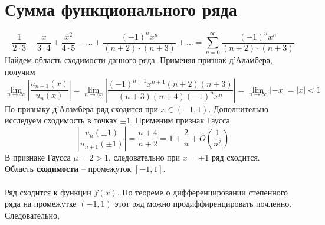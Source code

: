 \documentclass[a5paper, 10pt]{article}
\theoremstyle{definition}
\theoremstyle{plain}
\theoremstyle{remark}
\begin{document}
\newpage
\section{Сумма функционального ряда}
\begin{equation*}
\frac{1}{2 \cdot 3} - \frac{x}{3 \cdot 4} + \frac{x^2}{4 \cdot 5} - ... + \frac{(-1)^n x^n}{(n+ 2) \cdot(n+ 3)} + ... = 
\sum  \limits_{n = 0}^{\infty} \frac{(-1)^n x^n}{(n+ 2) \cdot(n+ 3)}
\end{equation*}
Найдем область сходимости данного ряда. Применяя признак  д'Аламбера, получим
\begin{equation*}
\lim_{n \to \infty} \left| \frac{u_{n+1} (x)}{u_{n} (x)} \right| =
 \lim_{n \to \infty}  \left| \frac{(-1)^{n+1} x^{n+1}(n+ 2) (n+ 3)}{(n+ 3) (n+ 4) (-1)^n x^n} \right| = 
 \lim_{n \to \infty}  \left| - x \right| = \left|  x \right|  < 1
\end{equation*}
По признаку д'Аламбера ряд сходится при $ x \in (-1, 1)$. Дополнительно исследуем сходимость в точках $\pm 1$. Применим признак Гаусса
\begin{equation*}
 \left| \frac{u_{n} (\pm 1)}{u_{n+1} (\pm 1)} \right| = \frac{n+ 4}{n+ 2} = 1 + \frac{2}{n} + O\left(\frac{1}{n^2} \right)
\end{equation*}
В признаке Гаусса $\mu = 2 > 1$, следовательно при $x = \pm 1$ ряд сходится.\\
Область \textbf{сходимости} -- промежуток $[-1, 1]$.\\\\
Ряд сходится к функции $f(x)$. По теореме о дифференцировании степенного ряда на промежутке $ (-1, 1)$ этот ряд можно продиффиренцировать почленно. Следовательно,
\end{document}
